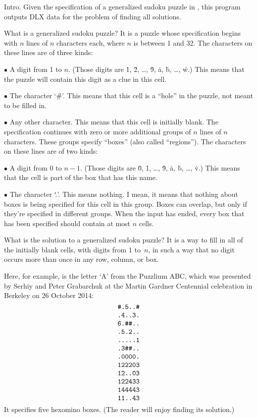 

Intro. Given the specification of a generalized sudoku puzzle in ,
this program outputs {\mc DLX} data for the problem of finding all solutions.

What is a generalized sudoku puzzle? It is a puzzle whose specification
begins with $n$ lines of $n$ characters each, where $n$ is between 1 and 32.
The characters on these lines are of three kinds:
\smallskip
\item{$\bullet$} A digit from 1 to $n$. (Those digits are \.1, \.2, \dots,
\.9, \.a, \.b, \dots, \.w.) This means that the puzzle will contain this
digit as a clue in this cell.
\item{$\bullet$} The character `\.{\#}'. This means that this cell is
a ``hole'' in the puzzle, not meant to be filled in.
\item{$\bullet$} Any other character. This means that this cell is initially
blank.
\smallskip\noindent
The specification continues with zero or more additional groups of
$n$ lines of $n$ characters. These groups specify ``boxes'' (also called
``regions''). The characters on these lines are of two kinds:
\smallskip
\item{$\bullet$} A digit from 0 to $n-1$. (Those digits are \.0, \.1, \dots,
\.9, \.a, \.b, \dots, \.v.) This means that the cell is part of the box
that has this name.
\item{$\bullet$} The character `\..'. This means nothing. I mean, it
means that nothing about boxes is being specified for this cell in this group.
\smallskip\noindent
Boxes can overlap, but only if they're specified in different groups.
When the input has ended, every box that has been specified should contain
at most $n$ cells.

What is the solution to a generalized sudoku puzzle? It is a way to fill in
all of the initially blank cells, with digits from 1 to~$n$, in such a
way that no digit occurs more than once in any row, column, or box.

Here, for example, is the letter `A' from the Puzzlium ABC,
which was presented by Serhiy and Peter Grabarchuk at the Martin Gardner
Centennial celebration in Berkeley on 26 October 2014:
$$\vcenter{\halign{\tt#\hfil\cr
\#.5..\#\cr
.4..3.\cr
6.\#\#..\cr
.5.2..\cr
.....1\cr
.3\#\#..\cr
.0000.\cr
122203\cr
12..03\cr
122433\cr
144443\cr
11..43\cr
}}$$
It specifies five hexomino boxes. (The reader will enjoy finding its solution.)

